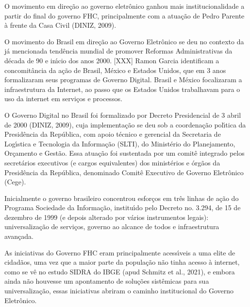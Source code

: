 \documentclass[
12pt,		%
openright,	%
twoside,  %
a4paper,			%
chapter=TITLE,		%
english,			%
french,				%
spanish,			%
brazil				%
]{USPSC-classe/USPSC}
\begin{document}
O movimento em dire\c{c}\~ao ao governo eletr\^onico ganhou mais institucionalidade a partir do final do governo FHC, principalmente com a atua\c{c}\~ao de Pedro Parente \`a frente da Casa Civil  (DINIZ, 2009).










O movimento do Brasil em dire\c{c}\~ao ao Governo Eletr\^onico se deu no contexto da j\'a mencionada tend\^encia mundial de promover Reformas Administrativas da d\'ecada de 90 e in\'{\i}cio dos anos 2000. [XXX] Ramon Garcia identificam a concomit\^ancia da a\c{c}\~ao de Brasil, M\'exico e Estados Unidos, que em 3 anos formalizaram seus programas de Governo Digital. Brasil e M\'exico focalizaram a infraestrutura da Internet, ao passo que os Estados Unidos trabalhavam para o uso da internet em servi\c{c}os e processos.










O Governo Digital no Brasil foi formalizado por Decreto Presidencial de 3 abril de 2000  (DINIZ, 2009), cuja implementa\c{c}\~ao se deu sob a coordena\c{c}\~ao pol\'{\i}tica da Presid\^encia da Rep\'ublica, com apoio t\'ecnico e gerencial da Secretaria de Log\'{\i}stica e Tecnologia da Informa\c{c}\~ao (SLTI), do Minist\'erio do Planejamento, Or\c{c}amento e Gest\~ao. Essa atua\c{c}\~ao foi sustentada por um comit\^e integrado pelos secret\'arios executivos (e cargos equivalentes) dos minist\'erios e \'org\~aos da Presid\^encia da Rep\'ublica, denominado Comit\^e Executivo de Governo Eletr\^onico (Cege).










Inicialmente o governo brasileiro concentrou esfor\c{c}os em tr\^es linhas de a\c{c}\~ao do Programa Sociedade da Informa\c{c}\~ao, institu\'{\i}do pelo Decreto no. 3.294, de 15 de dezembro de 1999 (e depois alterado por v\'arios instrumentos legais): universaliza\c{c}\~ao de servi\c{c}os, governo ao alcance de todos e infraestrutura avan\c{c}ada.










As iniciativas do Governo FHC eram principalmente acess\'{\i}veis a uma elite de cidad\~aos, uma vez que a maior parte da popula\c{c}\~ao n\~ao tinha acesso \`a internet, como se v\^e no estudo SIDRA do IBGE (apud Schmitz et al., 2021), e embora ainda n\~ao houvesse um apontamento de solu\c{c}\~oes sist\^emicas para sua universaliza\c{c}\~ao, essas iniciativas abriram o caminho institucional do Governo Eletr\^onico.
\end{document}

